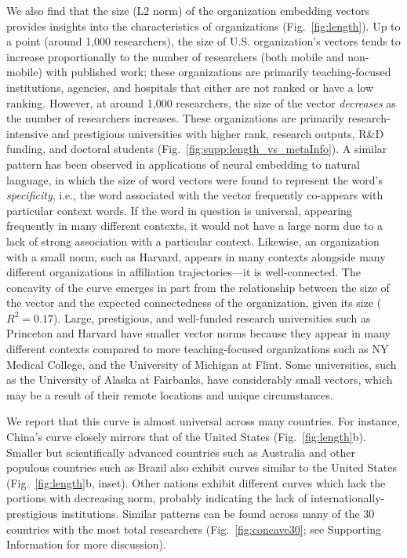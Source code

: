 \documentclass[12pt]{article} %
\def\SI{Supporting Information}
\begin{document}
We also find that the size (L2 norm) of the organization embedding vectors provides insights into the characteristics of organizations (Fig.~\ref{fig:length}).
Up to a point (around 1,000 researchers), the size of U.S. organization's vectors tends to increase proportionally to the number of researchers (both mobile and non-mobile) with published work;
these organizations are primarily teaching-focused institutions, agencies, and hospitals that either are not ranked or have a low ranking.
However, at around 1,000 researchers, the size of the vector \emph{decreases} as the number of researchers increases.
These organizations are primarily research-intensive and prestigious universities with higher rank, research outputs, R\&D funding, and doctoral students (Fig.~\ref{fig:supp:length_vs_metaInfo}).
A similar pattern has been observed in applications of neural embedding to natural language, in which the size of word vectors were found to represent the word's \emph{specificity}, i.e., the word associated with the vector frequently co-appears with particular context words\autocite{schakel2015measuring}.
If the word in question is universal, appearing frequently in many different contexts, it would not have a large norm due to a lack of strong association with a particular context.
Likewise, an organization with a small norm, such as Harvard, appears in many contexts alongside many different organizations in affiliation trajectories---it is well-connected.
The concavity of the curve emerges in part from the relationship between the size of the vector and the expected connectedness of the organization, given its size ($R^{2} = 0.17$).
Large, prestigious, and well-funded research universities such as Princeton and Harvard have smaller vector norms because they appear in many different contexts compared to more teaching-focused organizations such as NY Medical College, and the University of Michigan at Flint.
Some universities, such as the University of Alaska at Fairbanks, have considerably small vectors, which may be a result of their remote locations and unique circumstances.


We report that this curve is almost universal across many countries.
For instance, China's curve closely mirrors that of the United States (Fig.~\ref{fig:length}b).
Smaller but scientifically advanced countries such as Australia and other populous countries such as Brazil also exhibit curves similar to the United States (Fig.~\ref{fig:length}b, inset).
Other nations exhibit different curves which lack the portions with decreasing norm, probably indicating the lack of internationally-prestigious institutions.
Similar patterns can be found across many of the 30 countries with the most total researchers (Fig.~\ref{fig:concave30}; see \SI{} for more discussion).
\end{document}
